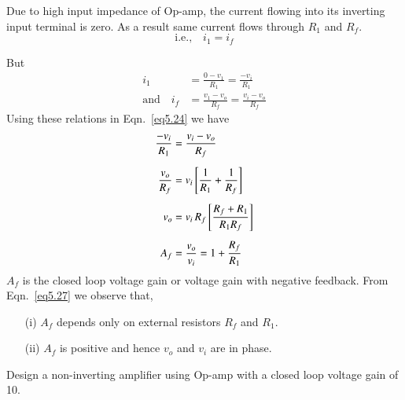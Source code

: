 Due to high input impedance of Op-amp, the current flowing into its inverting input terminal is zero. As a result same current flows through $R_{1}$ and $R_{f}$.
\begin{equation}
\text{i.e.,}\quad i_{1}=i_{f}\label{eq5.24}
\end{equation}

\eject

But
\begin{align}
i_{1} &= \frac{0-v_{1}}{R_{1}}=\frac{-v_{i}}{R_{1}}\label{eq5.25}\\[5pt]
\text{and}\quad i_{f} &= \frac{v_{1}-v_{o}}{R_{f}}=\frac{v_{i}-v_{o}}{R_{f}}\label{eq5.26}
\end{align}
Using these relations in Eqn.~\eqref{eq5.24} we have
\begin{align}
\frac{-v_{i}}{R_{1}} &= \frac{v_{i}-v_{o}}{R_{f}}\notag\\[5pt]
\frac{v_{o}}{R_{f}} &= v_{i}\left[\frac{1}{R_{1}}+\frac{1}{R_{f}}\right]\notag\\[5pt]
v_{o} &= v_{i}\,R_{f}\left[\frac{R_{f}+R_{1}}{R_{1}R_{f}}\right]\notag\\[5pt]
A_{f} &= \frac{v_{o}}{v_{i}}=1+\frac{R_{f}}{R_{1}}\label{eq5.27}
\end{align}
$A_{f}$ is the closed loop voltage gain or voltage gain with negative feedback. From Eqn.~\eqref{eq5.27} we observe that,
\begin{itemize}
\item[(i)] $A_{f}$ depends only on external resistors $R_{f}$ and $R_{1}$.

\item[(ii)] $A_{f}$ is positive and hence $v_{o}$ and $v_{i}$ are in phase.
\end{itemize}

\begin{example}\label{exam5.11}
Design a non-inverting amplifier using Op-amp with a closed loop voltage gain of 10.
\end{example}


